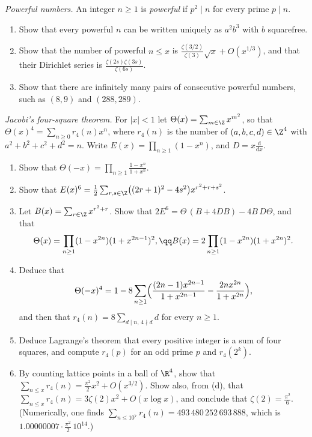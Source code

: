 \begin{exercise}[$\star\star$]\label{pb:powerful}
\emph{Powerful numbers.} An integer $n\ge1$ is \emph{powerful} if $p^2\mid n$ for every prime $p\mid n$.
\begin{enumerate}[label=(\alph*)]
\item Show that every powerful $n$ can be written uniquely as $a^2b^3$ with $b$ squarefree.
\item Show that the number of powerful $n\le x$ is $\frac{\zeta(3/2)}{\zeta(3)}\sqrt x+O(x^{1/3})$, and that their Dirichlet series is
$\frac{\zeta(2s)\zeta(3s)}{\zeta(6s)}$.
\item Show that there are infinitely many pairs of consecutive powerful numbers, such as $(8,9)$ and $(288,289)$.
\end{enumerate}
\end{exercise}

\begin{exercise}[Journey]\label{pb:jacobi}
\emph{Jacobi's four-square theorem.} For $|x|<1$ let $\Theta(x)=\sum_{m\in\Z}x^{m^2}$, so that $\Theta(x)^4=\sum_{n\ge0}r_4(n)x^n$, where $r_4(n)$ is the number of
$(a,b,c,d)\in\Z^4$ with $a^2+b^2+c^2+d^2=n$. Write $E(x)=\prod_{n\ge1}(1-x^n)$, and $D=x\frac{\mathrm d}{\mathrm dx}$.
\begin{enumerate}[label=(\alph*)]
\item Show that $\Theta(-x)=\prod_{n\ge1}\frac{1-x^n}{1+x^n}$.
\item Show that $E(x)^6=\frac12\sum_{r,s\in\Z}\bigl((2r+1)^2-4s^2\bigr)x^{r^2+r+s^2}$.
\item Let $B(x)=\sum_{r\in\Z}x^{r^2+r}$. Show that $2E^6=\Theta\,(B+4DB)-4B\,D\Theta$, and that
\[
\Theta(x)=\prod_{n\ge1}(1-x^{2n})(1+x^{2n-1})^2,\qq B(x)=2\prod_{n\ge1}(1-x^{2n})(1+x^{2n})^2.
\]
\item Deduce that
\[
\Theta(-x)^4=1-8\sum_{n\ge1}\Bigl(\frac{(2n-1)x^{2n-1}}{1+x^{2n-1}}-\frac{2nx^{2n}}{1+x^{2n}}\Bigr),
\]
and then that $r_4(n)=8\sum_{d\mid n,\,4\nmid d}d$ for every $n\ge1$.
\item Deduce Lagrange's theorem that every positive integer is a sum of four squares, and compute $r_4(p)$ for an odd prime $p$ and $r_4(2^k)$.
\item By counting lattice points in a ball of $\R^4$, show that $\sum_{n\le x}r_4(n)=\frac{\pi^2}2x^2+O(x^{3/2})$. Show also, from (d), that
$\sum_{n\le x}r_4(n)=3\zeta(2)x^2+O(x\log x)$, and conclude that $\zeta(2)=\frac{\pi^2}6$. (Numerically, one finds $\sum_{n\le10^7}r_4(n)=493\,480\,252\,693\,888$, which is
$1.00000007\cdot\frac{\pi^2}2\,10^{14}$.)
\end{enumerate}
\end{exercise}

